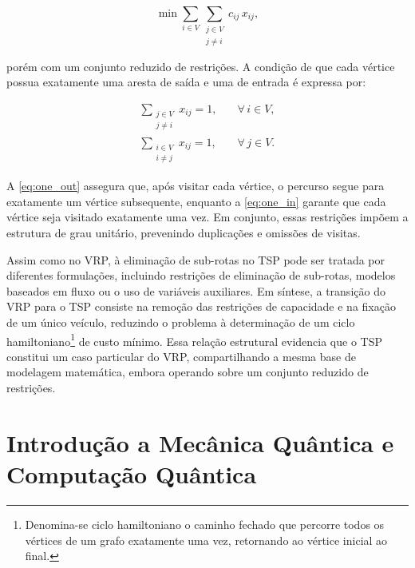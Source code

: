 \begin{equation}
    \min \sum_{i \in V} \sum_{\substack{j \in V \\ j \neq i}} c_{ij}\, x_{ij},
\end{equation}

\noindent porém com um conjunto reduzido de restrições. A condição de que cada vértice possua exatamente uma aresta de saída e uma de entrada é expressa por:

\begin{eqnarray}
\sum_{\substack{j \in V \\ j \neq i}} x_{ij} = 1, & \quad \forall\, i \in V, \label{eq:one_out} \\[4pt]
\sum_{\substack{i \in V \\ i \neq j}} x_{ij} = 1, & \quad \forall\, j \in V. \label{eq:one_in}
\end{eqnarray}

A \autoref{eq:one_out} assegura que, após visitar cada vértice, o percurso segue para exatamente um vértice subsequente, enquanto a \autoref{eq:one_in} garante que cada vértice seja visitado exatamente uma vez. Em conjunto, essas restrições impõem a estrutura de grau unitário, prevenindo duplicações e omissões de visitas.

Assim como no VRP, à eliminação de sub-rotas no TSP pode ser tratada por diferentes formulações, incluindo restrições de eliminação de sub-rotas, modelos baseados em fluxo ou o uso de variáveis auxiliares. Em síntese, a transição do VRP para o TSP consiste na remoção das restrições de capacidade e na fixação de um único veículo, reduzindo o problema à determinação de um ciclo hamiltoniano\footnote{Denomina-se ciclo hamiltoniano o caminho fechado que percorre todos os vértices de um grafo exatamente uma vez, retornando ao vértice inicial ao final.} de custo mínimo. Essa relação estrutural evidencia que o TSP constitui um caso particular do VRP, compartilhando a mesma base de modelagem matemática, embora operando sobre um conjunto reduzido de restrições.

\section{Introdução a Mecânica Quântica e Computação Quântica}

